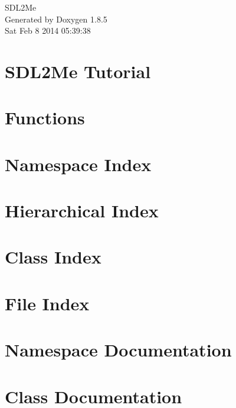 \documentclass[twoside]{book}
\newcommand{\clearemptydoublepage}{%
  \newpage{\pagestyle{empty}\cleardoublepage}%
}
\begin{document}
\hypersetup{pageanchor=false}
\begin{titlepage}
\vspace*{7cm}
\begin{center}%
{\Large S\-D\-L2\-Me }\\
\vspace*{1cm}
{\large Generated by Doxygen 1.8.5}\\
\vspace*{0.5cm}
{\small Sat Feb 8 2014 05:39:38}\\
\end{center}
\end{titlepage}
\clearemptydoublepage
\tableofcontents
\clearemptydoublepage
{}
\hypersetup{pageanchor=true}

\chapter{S\-D\-L2\-Me Tutorial}
\label{index}\hypertarget{index}{}
\chapter{Functions}
\label{_functions}
\hypertarget{_functions}{}

\chapter{Namespace Index}

\chapter{Hierarchical Index}

\chapter{Class Index}

\chapter{File Index}

\chapter{Namespace Documentation}


\chapter{Class Documentation}













\end{document}
